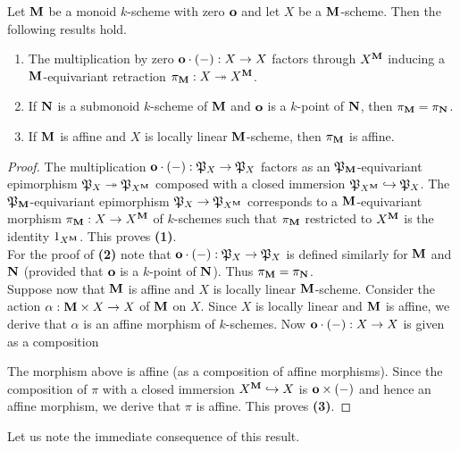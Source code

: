\begin{proposition}\label{proposition:retraction_for_monoids_with_zero}
Let $\mathbf{M}$ be a monoid $k$-scheme with zero $\mathbf{o}$ and let $X$ be a $\mathbf{M}$-scheme. Then the following results hold.
\begin{enumerate}[label=\emph{\textbf{(\arabic*)}}, leftmargin=1.5em]
\item The multiplication by zero $\mathbf{o}\cdot(-):X\rightarrow X$ factors through $X^{\mathbf{M}}$ inducing a $\mathbf{M}$-equivariant retraction $\pi_{\mathbf{M}}:X\twoheadrightarrow X^{\mathbf{M}}$.
\item If $\mathbf{N}$ is a submonoid $k$-scheme of $\mathbf{M}$ and $\mathbf{o}$ is a $k$-point of $\mathbf{N}$, then $\pi_{\mathbf{M}} = \pi_{\mathbf{N}}$.
\item If $\mathbf{M}$ is affine and $X$ is locally linear $\mathbf{M}$-scheme, then $\pi_{\mathbf{M}}$ is affine.
\end{enumerate}
\end{proposition}
\begin{proof}
The multiplication $\mathbf{o}\cdot (-):{\mathfrak P}_X\rightarrow {\mathfrak P}_X$ factors as an ${\mathfrak P}_{\mathbf{M}}$-equivariant epimorphism ${\mathfrak P}_X\twoheadrightarrow {\mathfrak P}_{X^{\mathbf{M}}}$ composed with a closed immersion ${\mathfrak P}_{X^{\mathbf{M}}}\hookrightarrow {\mathfrak P}_X$. The ${\mathfrak P}_{\mathbf{M}}$-equivariant epimorphism ${\mathfrak P}_X\rightarrow {\mathfrak P}_{X^{\mathbf{M}}}$ corresponds to a $\mathbf{M}$-equivariant morphism $\pi_{\mathbf{M}}:X\rightarrow X^{\mathbf{M}}$ of $k$-schemes such that $\pi_{\mathbf{M}}$ restricted to $X^{\mathbf{M}}$ is the identity $1_{X^{\mathbf{M}}}$. This proves \textbf{(1)}.\\
For the proof of \textbf{(2)} note that $\mathbf{o}\cdot (-):{\mathfrak P}_X\rightarrow {\mathfrak P}_X$ is defined similarly for $\mathbf{M}$ and $\mathbf{N}$ (provided that $\mathbf{o}$ is a $k$-point of $\mathbf{N}$). Thus $\pi_{\mathbf{M}} = \pi_{\mathbf{N}}$.\\
Suppose now that $\mathbf{M}$ is affine and $X$ is locally linear $\mathbf{M}$-scheme. Consider the action $\alpha:\mathbf{M}\times X\rightarrow X$ of $\mathbf{M}$ on $X$. Since $X$ is locally linear and $\mathbf{M}$ is affine, we derive that $\alpha$ is an affine morphism of $k$-schemes. Now $\mathbf{o}\cdot (-):X\rightarrow X$ is given as a composition 
\begin{center}
\end{center}
The morphism above is affine (as a composition of affine morphisms). Since the composition of $\pi$ with a closed immersion $X^{\mathbf{M}}\hookrightarrow X$ is $\mathbf{o}\times(-)$ and hence an affine morphism, we derive that $\pi$ is affine. This proves \textbf{(3)}.
\end{proof}
\noindent
Let us note the immediate consequence of this result.

